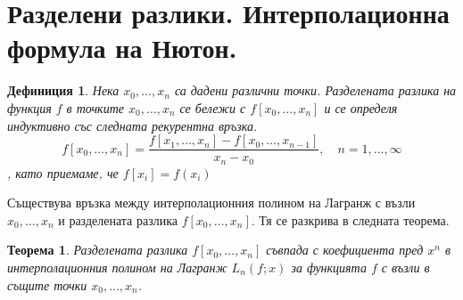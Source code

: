 \documentclass[12pt]{article}
\numberwithin{equation}{section}
\newtheorem{theorem}{Теорема}
\newtheorem{definition}{Дефиниция}
\numberwithin{theorem}{section}
\numberwithin{definition}{section}
\numberwithin{corollary}{section}
\begin{document}
\section{Разделени разлики. Интерполационна формула на Нютон.}
\begin{definition}
Нека $x_0, \dotso, x_n$ са дадени различни точки. Разделената разлика на функция $f$ в точките $x_0, \dotso, x_n$ се бележи с $f[x_0, \dotso, x_n]$ и се определя индуктивно със следната рекурентна връзка.
\begin{equation}\label{e6}
f[x_0, \dotso, x_n] = \frac{f[x_1, \dotso, x_n] - f[x_0, \dotso, x_{n-1}]}{x_n - x_0},\hspace{12pt}n = 1, \dotso, \infty
\end{equation}
, като приемаме, че $f[x_i] = f(x_i)$
\end{definition}
\par
Съществува връзка между интерполационния полином на Лагранж с възли $x_0, \dotso, x_n$ и разделената разлика $f[x_0, \dotso, x_n]$. Тя се разкрива в следната теорема.
\begin{theorem} \label{Th1}
Разделената разлика $f[x_0, \dotso, x_n]$ съвпада с коефициента пред $x^n$ в интерполационния полином на Лагранж $L_n(f;x)$ за функцията $f$ с възли в същите точки $x_0, \dotso, x_n$.
\end{theorem}
\end{document}
